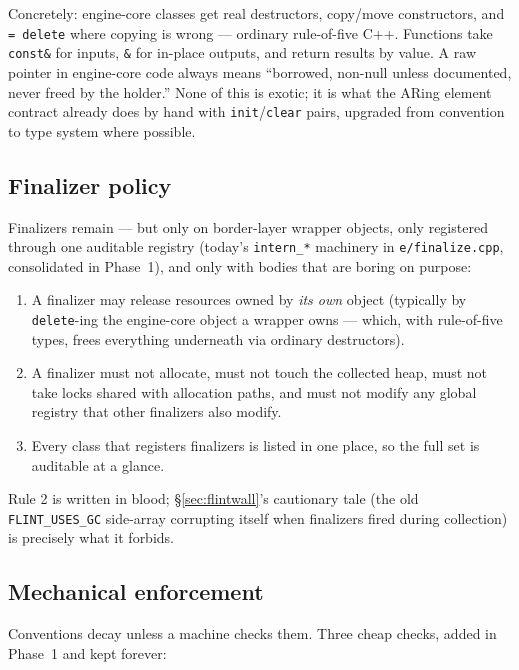 \documentclass[11pt,oneside]{report}
\newcommand{\code}[1]{\textcolor{m2code}{\texttt{#1}}}
\newcommand{\file}[1]{\textcolor{m2file}{\texttt{#1}}}
\begin{document}
Concretely: engine-core classes get real destructors, copy/move constructors,
and \code{=\,delete} where copying is wrong --- ordinary rule-of-five C++.
Functions take \code{const\&} for inputs, \code{\&} for in-place outputs, and
return results by value. A raw pointer in engine-core code always means
``borrowed, non-null unless documented, never freed by the holder.'' None of
this is exotic; it is what the ARing element contract already does by hand
with \code{init}/\code{clear} pairs, upgraded from convention to type system
where possible.

\subsection{Finalizer policy}
\label{sec:finalizerpolicy}

Finalizers remain --- but only on border-layer wrapper objects, only
registered through one auditable registry (today's \code{intern\_*} machinery
in \file{e/finalize.cpp}, consolidated in Phase~1), and only with bodies that
are boring on purpose:

\begin{enumerate}
\item A finalizer may release resources owned by \emph{its own} object
  (typically by \code{delete}-ing the engine-core object a wrapper owns ---
  which, with rule-of-five types, frees everything underneath via ordinary
  destructors).
\item A finalizer must not allocate, must not touch the collected heap, must
  not take locks shared with allocation paths, and must not modify any global
  registry that other finalizers also modify.
\item Every class that registers finalizers is listed in one place, so the
  full set is auditable at a glance.
\end{enumerate}

Rule 2 is written in blood; \S\ref{sec:flintwall}'s cautionary tale (the old
\code{FLINT\_USES\_GC} side-array corrupting itself when finalizers fired
during collection) is precisely what it forbids.

\subsection{Mechanical enforcement}
\label{sec:enforcement}

Conventions decay unless a machine checks them. Three cheap checks, added in
Phase~1 and kept forever:
\end{document}
